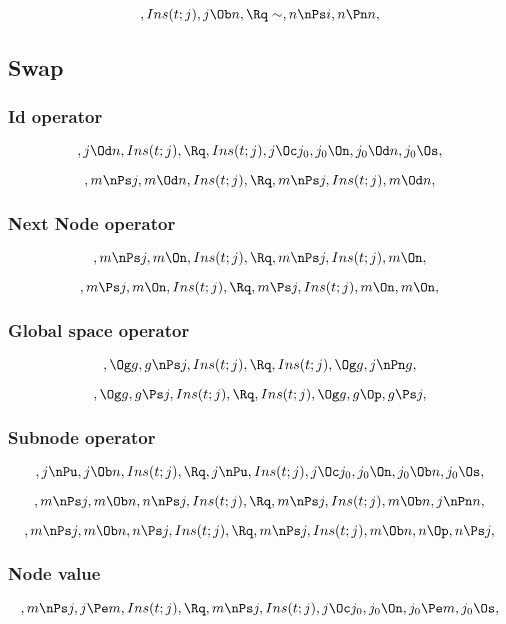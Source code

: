 \[, Ins(t;j), j \Ob n, \Rq \sim, n \nPs i, n \Pn n, \]



\bigskip
\bigskip
\subsection{Swap}

\subsubsection{Id operator}
\[, j \Od n, Ins(t;j), \Rq , Ins(t;j), j \Oc j_0, j_0 \On,  j_0 \Od n, j_0 \Os, \]

\[, m \nPs j, m \Od n, Ins(t;j), \Rq , m \nPs j, Ins(t;j), m \Od n, \]


\subsubsection{Next Node operator}
\[, m \nPs j, m \On, Ins(t;j), \Rq , m \nPs j, Ins(t;j), m \On, \]

\[, m \Ps j, m \On, Ins(t;j), \Rq , m \Ps j, Ins(t;j), m \On, m \On, \]

\subsubsection{Global space operator}
\[, \Og g, g \nPs j, Ins(t;j), \Rq , Ins(t;j), \Og g, j \nPn g,  \]

\[, \Og g, g \Ps j, Ins(t;j), \Rq , Ins(t;j), \Og g, g \Op, g \Ps j,  \]

\subsubsection{Subnode operator}
\[, j \nPu, j \Ob n, Ins(t;j), \Rq , j \nPu, Ins(t;j), j \Oc j_0, j_0 \On, j_0 \Ob n, j_0 \Os, \]

\[, m \nPs j, m \Ob n, n \nPs j, Ins(t;j), \Rq , m \nPs j, Ins(t;j), m \Ob n, j \nPn n,  \]

\[, m \nPs j, m \Ob n, n \Ps j, Ins(t;j), \Rq , m \nPs j, Ins(t;j), m \Ob n, n \Op, n \Ps j, \]



\subsubsection{Node value}
\[, m \nPs j, j \Pe m, Ins(t;j), \Rq , m \nPs j, Ins(t;j), j \Oc j_0, j_0 \On, j_0 \Pe m, j_0 \Os, \]




